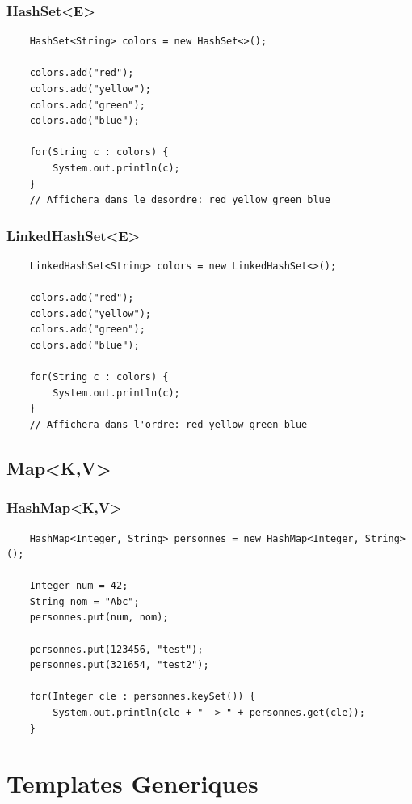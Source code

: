 \documentclass[a4paper, 12pt, french]{article}
\begin{document}
	\subsubsection{HashSet<E>}

	\begin{lstlisting}
	HashSet<String> colors = new HashSet<>();

	colors.add("red");
	colors.add("yellow");
	colors.add("green");
	colors.add("blue");

	for(String c : colors) {
		System.out.println(c);
	}
	// Affichera dans le desordre: red yellow green blue
	\end{lstlisting}

	\subsubsection{LinkedHashSet<E>}

	\begin{lstlisting}
	LinkedHashSet<String> colors = new LinkedHashSet<>();

	colors.add("red");
	colors.add("yellow");
	colors.add("green");
	colors.add("blue");

	for(String c : colors) {
		System.out.println(c);
	}
	// Affichera dans l'ordre: red yellow green blue
	\end{lstlisting}

	\subsection{Map<K,V>}

	\subsubsection{HashMap<K,V>}

	\begin{lstlisting}
	HashMap<Integer, String> personnes = new HashMap<Integer, String>();

	Integer num = 42;
	String nom = "Abc";
	personnes.put(num, nom);

	personnes.put(123456, "test");
	personnes.put(321654, "test2");

	for(Integer cle : personnes.keySet()) {
		System.out.println(cle + " -> " + personnes.get(cle));
	}
	\end{lstlisting}

	\section{Templates Generiques}
\end{document}

